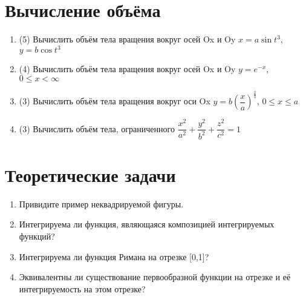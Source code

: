 \documentclass[9pt, a4paper]{extarticle}
\numberwithin{equation}{section}
\numberwithin{lemma}{section}
\numberwithin{definition}{section}
\numberwithin{notabene}{section}
\numberwithin{corollary}{section}
\begin{document}
	\section{Вычисление объёма}
	\begin{enumerate}
		\item (5) Вычислить объём тела вращения вокруг осей Ox и Oy $x = a \sin{t}^3$, $y = b \cos{t}^3$
		\item (4) Вычислить объём тела вращения вокруг осей Ox и Oy $ y = e^{-x}$, $ 0 \leq x < \infty$
		\item (3) Вычислить объём тела вращения вокруг оси Ox $y = b\left(\dfrac{x}{a}\right)^{\frac23}$, $0 \leq x \leq a$
		\item (3) Вычислить объём тела, ограниченного $\dfrac{x^2}{a^2}+\dfrac{y^2}{b^2}+\dfrac{z^2}{c^2} = 1$
	\end{enumerate}
	\newpage
	\section*{Теоретические задачи}
	\begin{enumerate}
		\item Привидите пример неквадрируемой фигуры.
		\item Интегрируема ли функция, являющаяся композицией интегрируемых функций?
		\item Интегрируема ли функция Римана на отрезке [0,1]?
		\item Эквивалентны ли существование первообразной функции на отрезке и её интегрируемость на этом отрезке?
		
	\end{enumerate}
\end{document}
